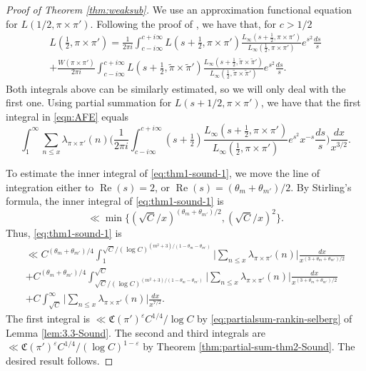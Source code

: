 \documentclass[12pt,reqno]{amsart}
\theoremstyle{remark}
\DeclareMathOperator{\Real}{Re}
\numberwithin{equation}{section}
\begin{document}
	\begin{proof}[Proof of Theorem \ref{thm:weaksub}]
	We use an approximation functional equation for $L(1/2, \pi \times \pi')$. Following the proof of \cite[Theorem 1]{S},  we have that, for $c > 1/2$
            \begin{multline}
            \label{eqn:AFE}
			L(\tfrac{1}{2}, \pi\times \pi') = \frac{1}{2\pi i}\int_{c-i\infty}^{c+i\infty} L(s+\tfrac{1}{2},\pi\times \pi') \frac{L_{\infty}(s+\tfrac{1}{2},\pi\times \pi')}{L_{\infty}(\tfrac{1}{2}, \pi\times \pi')}e^{s^2} \frac{ds}{s} \\
			+ \frac{W(\pi\times\pi')}{2\pi i}\int_{c-i\infty}^{c+i\infty} L(s+\tfrac{1}{2},\widetilde{\pi}\times \widetilde{\pi}') \frac{L_{\infty}(s+\tfrac{1}{2},\widetilde{\pi}\times \widetilde{\pi}')}{L_{\infty}(\tfrac{1}{2}, \widetilde{\pi}\times \widetilde{\pi}')}e^{s^2} \frac{ds}{s}.
            \end{multline}
	Both integrals above can be similarly estimated, so we will only deal with the first one. Using partial summation for $L(s+1/2,\pi \times \pi')$, we have that the first integral in \eqref{eqn:AFE} equals
	\begin{equation}
        \label{eq:thm1-sound-1}
			\int_1^\infty \sum_{n\le x} \lambda_{\pi\times\pi'}(n) \Big( \frac{1}{2\pi i}\int_{c-i\infty}^{c+i\infty} (s+\tfrac{1}{2}) \frac{L_{\infty}(s+\tfrac{1}{2},\pi\times \pi')}{L_{\infty}(\tfrac{1}{2}, \pi\times \pi')}e^{s^2}x^{-s} \frac{ds}{s} \Big) \frac{dx}{x^{3/2}}.
	\end{equation}
		
		To estimate the inner integral of \eqref{eq:thm1-sound-1}, we move the line of integration either to $\Real(s) =2$, or $\Real(s) = (\theta_m+\theta_{m'})/{2}$. By Stirling's formula, the inner integral of \eqref{eq:thm1-sound-1} is 
		\[
		      \ll \min\big\{(\sqrt{C}/x)^{{(\theta_m+\theta_{m'})}/{2}}, (\sqrt{C}/x)^2\big\}.
		\] 
		Thus, \eqref{eq:thm1-sound-1} is
    \begin{multline*}
        \ll C^{(\theta_m+\theta_{m'})/{4}}\int_1^{\sqrt{C}/(\log C)^{(m^2+3)/(1-\theta_m-\theta_{m'})}}\Big|\sum_{n\le x}\lambda_{\pi\times \pi'}(n)\Big| \frac{dx}{x^{(3+\theta_m+\theta_{m'})/{2}}}\\
        +C^{(\theta_m+\theta_{m'})/{4}}\int_{\sqrt{C}/(\log C)^{(m^2+3)/(1-\theta_m-\theta_{m'})}}^{\sqrt{C}}\Big|\sum_{n\le x}\lambda_{\pi\times \pi'}(n)\Big| \frac{dx}{x^{(3+\theta_m+\theta_{m'})/{2}}}\\
        + C \int_{\sqrt{C}}^{\infty} \Big|\sum_{n\le x}\lambda_{\pi\times \pi'}(n)\Big|\frac{dx}{x^{7/2}}.
    \end{multline*}
    The first integral is $\ll \mathfrak{C}(\pi')^\varepsilon C^{1/4}/\log C$ by \eqref{eq:partialsum-rankin-selberg} of Lemma \ref{lem:3.3-Sound}.  The second and third integrals are $\ll \mathfrak{C}(\pi')^\varepsilon C^{1/4}/(\log C)^{1-\varepsilon}$ by Theorem  \ref{thm:partial-sum-thm2-Sound}. The desired result follows.
	\end{proof}
\end{document}
